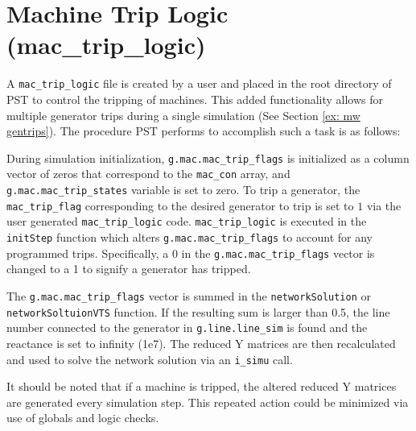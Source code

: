 \section{Machine Trip Logic (mac\_trip\_logic)}  
A \verb|mac_trip_logic| file is created by a user and placed in the root directory of PST to control the tripping of machines.
This added functionality allows for multiple generator trips during a single simulation (See Section \ref{ex: mw gentrips}).
The procedure PST performs to accomplish such a task is as follows:

During simulation initialization, \verb|g.mac.mac_trip_flags| is initialized as a column vector of zeros that correspond to the \verb|mac_con| array, and 
\verb|g.mac.mac_trip_states| variable is set to zero. %
To trip a generator, the \verb|mac_trip_flag| corresponding to the desired generator to trip is set to $1$ via the user generated \verb|mac_trip_logic| code.
\verb|mac_trip_logic| is executed in the \verb|initStep| function which alters \verb|g.mac.mac_trip_flags| to account for any programmed trips.
Specifically, a $0$ in the \verb|g.mac.mac_trip_flags| vector is changed to a 1 to signify a generator has tripped.


The \verb|g.mac.mac_trip_flags| vector is summed in the \verb|networkSolution| or \\ \verb|networkSoltuionVTS|  function.
If the resulting sum is larger than 0.5, the line number connected to the generator in \verb|g.line.line_sim| is found and the reactance is set to infinity (1e7).
The reduced Y matrices are then recalculated and used to solve the network solution via an \verb|i_simu| call.


It should be noted that if a machine is tripped, the altered reduced Y matrices are generated every simulation step.
This repeated action could be minimized via use of globals and logic checks.